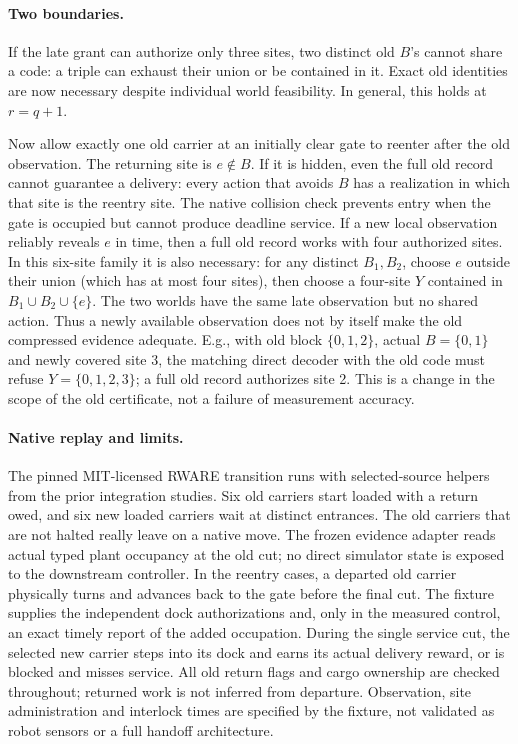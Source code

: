 \documentclass{article}
\begin{document}
\paragraph{Two boundaries.}
If the late grant can authorize only three sites, two distinct old \(B\)'s cannot share a code: a triple can exhaust their union or be contained in it. Exact old identities are now necessary despite individual world feasibility. In general, this holds at \(r=q+1\).

Now allow exactly one old carrier at an initially clear gate to reenter after the old observation. The returning site is \(e\notin B\). If it is hidden, even the full old record cannot guarantee a delivery: every action that avoids \(B\) has a realization in which that site is the reentry site. The native collision check prevents entry when the gate is occupied but cannot produce deadline service. If a new local observation reliably reveals \(e\) in time, then a full old record works with four authorized sites. In this six-site family it is also necessary: for any distinct \(B_1,B_2\), choose \(e\) outside their union (which has at most four sites), then choose a four-site \(Y\) contained in \(B_1\cup B_2\cup\{e\}\). The two worlds have the same late observation but no shared action. Thus a newly available observation does not by itself make the old compressed evidence adequate. E.g., with old block \(\{0,1,2\}\), actual \(B=\{0,1\}\) and newly covered site \(3\), the matching direct decoder with the old code must refuse \(Y=\{0,1,2,3\}\); a full old record authorizes site 2. This is a change in the scope of the old certificate, not a failure of measurement accuracy.

\paragraph{Native replay and limits.}
The pinned MIT-licensed RWARE transition runs with selected-source helpers from the prior integration studies. Six old carriers start loaded with a return owed, and six new loaded carriers wait at distinct entrances. The old carriers that are not halted really leave on a native move. The frozen evidence adapter reads actual typed plant occupancy at the old cut; no direct simulator state is exposed to the downstream controller. In the reentry cases, a departed old carrier physically turns and advances back to the gate before the final cut. The fixture supplies the independent dock authorizations and, only in the measured control, an exact timely report of the added occupation. During the single service cut, the selected new carrier steps into its dock and earns its actual delivery reward, or is blocked and misses service. All old return flags and cargo ownership are checked throughout; returned work is not inferred from departure. Observation, site administration and interlock times are specified by the fixture, not validated as robot sensors or a full handoff architecture.
\end{document}
